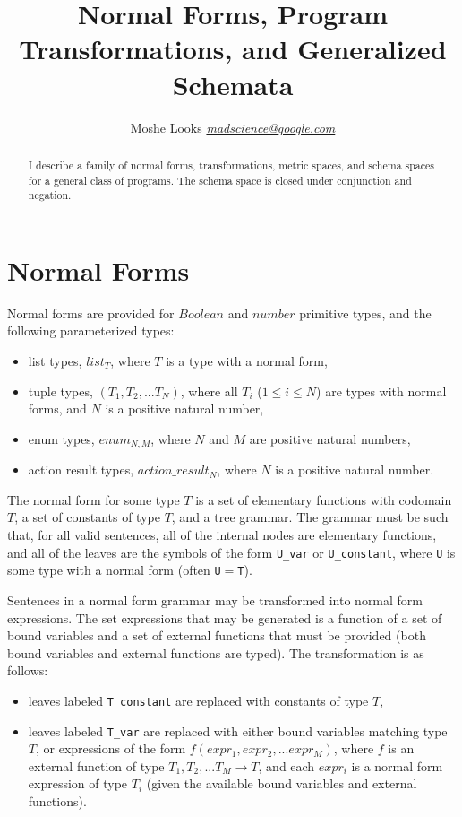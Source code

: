 \documentclass[letterpaper]{article}
\begin{document}
\sloppy
\title
{Normal Forms, Program Transformations, and Generalized Schemata}
\author{
  Moshe Looks
  \href{mailto:moshe@metacog.org}{\emph{madscience@google.com}}
}
\maketitle

\begin{abstract}
  I describe a family of normal forms, transformations, metric spaces, and
  schema spaces for a general class of programs. The schema space is closed
  under conjunction and negation.
\end{abstract}

\section{Normal Forms}

Normal forms are provided for $Boolean$ and $number$ primitive types, and the
following parameterized types:
\begin{itemize}
\item list types, $list_T$, where $T$ is a type with a normal form,
\item tuple types, $(T_1,T_2, ... T_N)$, where all $T_i$ ($1 \leq i \leq N$)
  are types with normal forms, and $N$ is a positive natural number,
\item enum types, $enum_{N,M}$, where $N$ and $M$ are positive natural
  numbers,
\item action result types, $action\_result_N$, where $N$ is a positive natural
  number.
\end{itemize}

The normal form for some type $T$ is a set of elementary functions with
codomain $T$, a set of constants of type $T$, and a tree grammar. The grammar
must be such that, for all valid sentences, all of the internal nodes are
elementary functions, and all of the leaves are the symbols of the form
\verb|U_var| or \verb|U_constant|, where \verb|U| is some type with a normal
form (often \verb|U|$=$\verb|T|).

Sentences in a normal form grammar may be transformed into normal form
expressions. The set expressions that may be generated is a function of a set
of bound variables and a set of external functions that must be provided (both
bound variables and external functions are typed). The transformation is as
follows:
\begin{itemize}
\item leaves labeled \verb|T_constant| are replaced with constants of type $T$,
\item leaves labeled \verb|T_var| are replaced with either bound variables
  matching type $T$, or expressions of the form $f(expr_1, expr_2,
  ... expr_M)$, where $f$ is an external function of type $T_1, T_2, ... T_M
  \rightarrow T$, and each $expr_i$ is a normal form expression of type $T_i$
  (given the available bound variables and external functions).
\end{itemize}
\end{document}
